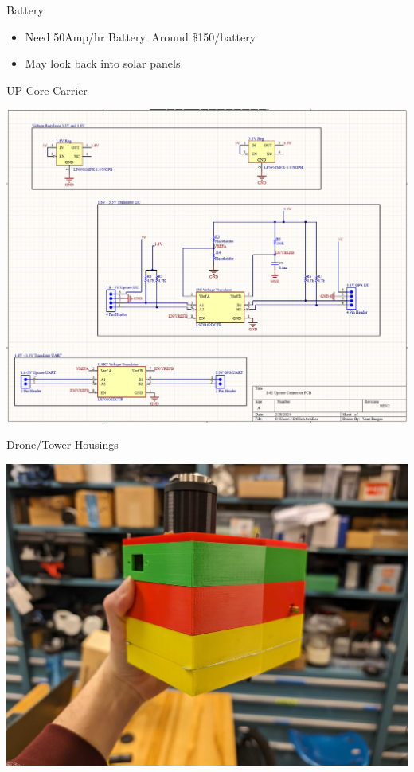 \begin{frame}{Battery}
\begin{itemize}
    \item Need 50Amp/hr Battery. Around \$150/battery
    \item May look back into solar panels
\end{itemize}
\end{frame}
\begin{frame}{UP Core Carrier}
\begin{center}
    \includegraphics[scale=.17]{images/rtt_pcb.png}
\end{center}
\end{frame}
\begin{frame}{Drone/Tower Housings}
\begin{center}
    \includegraphics[scale=.05]{images/rtt_case.jpg}
\end{center}
\end{frame}